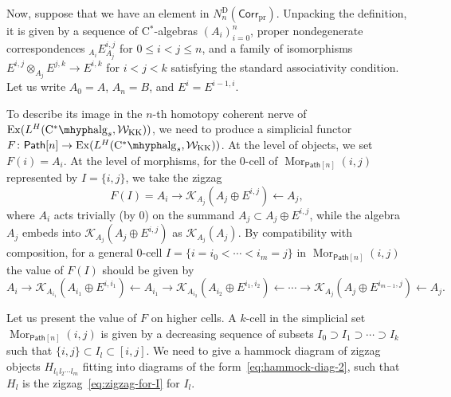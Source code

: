 \documentclass[a4paper,reqno]{amsart}
\theoremstyle{plain}
\theoremstyle{definition}
\theoremstyle{remark}
\numberwithin{equation}{section}
\newcommand{\cK}{\mathcal{K}}
\newcommand{\cW}{\mathcal{W}}
\newcommand{\Path}{\mathsf{Path}}
\newcommand{\CstAlg}{\mathrm{C}^*\mhyph\mathrm{alg}}
\newcommand{\PrCorr}{\mathsf{Corr}_{\mathrm{pr}}}
\newcommand{\KK}{\mathrm{KK}}
\newcommand{\Ex}{\mathrm{Ex}}
\newcommand{\ND}{N^{\mathrm{D}}}
\DeclareMathOperator{\Mor}{Mor}
\begin{document}
Now, suppose that we have an element in $\ND_n(\PrCorr)$.
Unpacking the definition, it is given by a sequence of C$^*$-algebras $(A_i)_{i = 0}^n$, proper nondegenerate correspondences ${}_{A_{i}} E^{i, j}_{A_j}$ for $0 \le i < j \le n$, and a family of isomorphisms $E^{i, j} \otimes_{A_j} E^{j, k} \to E^{i, k}$ for $i < j < k$ satisfying the standard associativity condition.
Let us write $A_0 = A$, $A_n = B$, and $E^i = E^{i-1, i}$.

To describe its image in the $n$-th homotopy coherent nerve of $\Ex(L^H(\CstAlg_s, \cW_{\KK}))$, we need to produce a simplicial functor $F \colon \Path[n] \to \Ex(L^H(\CstAlg_s, \cW_{\KK}))$.
At the level of objects, we set $F(i) = A_i$.
At the level of morphisms, for the $0$-cell of $\Mor_{\Path[n]}(i, j)$ represented by $I = \{i, j\}$, we take the zigzag
\[
F(I) = A_i \to \cK_{A_j}(A_j \oplus E^{i,j}) \leftarrow A_j,
\]
where $A_i$ acts trivially (by $0$) on the summand $A_j \subset A_j \oplus E^{i, j}$, while the algebra $A_j$ embeds into $\cK_{A_j}(A_j \oplus E^{i,j})$ as $\cK_{A_j}(A_j)$.
By compatibility with composition, for a general $0$-cell $I = \{i = i_0 < \cdots < i_m = j \}$ in $\Mor_{\Path[n]}(i, j)$ the value of $F(I)$ should be given by
\begin{equation}\label{eq:zigzag-for-I}
A_i \to \cK_{A_{i_1}}(A_{i_1} \oplus E^{i, i_1}) \leftarrow A_{i_1} \to \cK_{A_{i_2}}(A_{i_2} \oplus E^{i_1, i_2}) \leftarrow \cdots \to \cK_{A_j}(A_j \oplus E^{i_{m-1},j}) \leftarrow A_j.
\end{equation}

Let us present the value of $F$ on higher cells.
A $k$-cell in the simplicial set $\Mor_{\Path[n]}(i, j)$ is given by a decreasing sequence of subsets $I_0 \supset I_1 \supset \cdots \supset I_k$ such that $\{i, j\} \subset I_l \subset [i, j]$.
We need to give a hammock diagram of zigzag objects $H_{l_1 l_2 \cdots l_m}$ fitting into diagrams of the form~\eqref{eq:hammock-diag-2}, such that $H_l$ is the zigzag~\eqref{eq:zigzag-for-I} for $I_l$.
\end{document}
